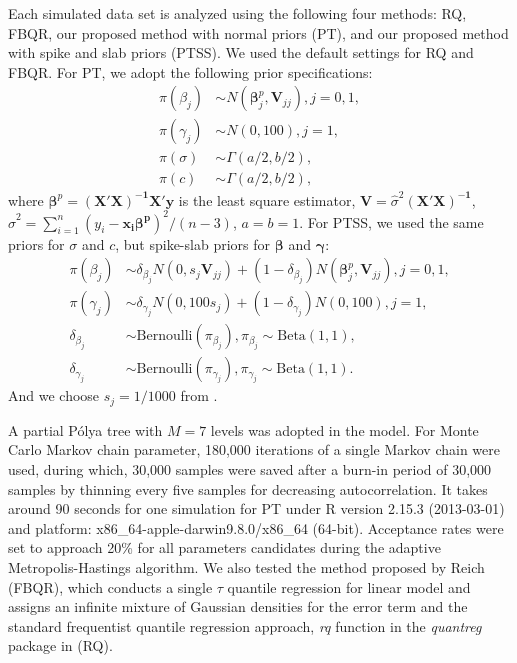 \documentclass[12pt]{article}
\newcommand{\polya}{P\'{o}lya}
\begin{document}
Each simulated data set is analyzed using the following four methods:
RQ, FBQR, our proposed method with normal priors (PT), and our
proposed method with spike and slab priors (PTSS).  We used the
default settings for RQ and FBQR.  For PT, we adopt the following
prior specifications:
\begin{align*}
  \pi(\beta_j) & \sim N(\bm \beta_j^p, \bm V_{jj}) , j = 0, 1,\\
  \pi(\gamma_j) & \sim N(0, 100), j = 1,\\
  \pi(\sigma) & \sim \Gamma (a/2, b/2), \\
  \pi(c) & \sim \Gamma(a/2, b/2),
\end{align*}
where $\bm \beta^p = \bm{(X'X)^{-1}X'y}$ is the least square
estimator, $\bm V = \hat{\sigma}^2\bm{(X'X)^{-1}}$, $\hat{\sigma}^2 =
\sum_{i = 1}^n (y_i - \bm {x_i \beta^p})^2/ (n - 3)$, $a = b = 1$.
For PTSS, we used the same priors for $\sigma$ and $c$, but spike-slab
priors for $\bm \beta$ and $\bm \gamma$:
\begin{align*}
  \pi(\beta_j) & \sim \delta_{\beta_j}N(0, s_j\bm V_{jj}) +  (1 - \delta_{\beta_j})N(\bm \beta_j^p, \bm V_{jj}) , j = 0, 1, \\
  \pi(\gamma_j) & \sim \delta_{\gamma_j}N(0, 100s_j) + (1 - \delta_{\gamma_j}) N(0, 100), j = 1, \\
  \delta_{\beta_j} & \sim \mbox{Bernoulli}(\pi_{\beta_j}) , \pi_{\beta_j} \sim \mbox{Beta}(1, 1),\\
  \delta_{\gamma_j} & \sim \mbox{Bernoulli}(\pi_{\gamma_j}),
  \pi_{\gamma_j} \sim \mbox{Beta}(1, 1).
\end{align*}
And we choose $s_j = 1/1000$ from \cite{george1993}.

A partial \polya{} tree with $M=7$ levels was adopted in the
model. For Monte Carlo Markov chain parameter, 180,000 iterations of a
single Markov chain were used, during which, 30,000 samples were saved
after a burn-in period of 30,000 samples by thinning every five samples for
decreasing autocorrelation.  It takes around 90 seconds
for one simulation for PT under R version 2.15.3 (2013-03-01) and
platform: x86\_64-apple-darwin9.8.0/x86\_64 (64-bit). Acceptance rates
were set to approach 20\% for all parameters
candidates during the adaptive Metropolis-Hastings algorithm.  We also
tested the method proposed by Reich (FBQR), which conducts a single
$\tau$ quantile regression for linear model and assigns an infinite
mixture of Gaussian densities for the error term and the standard
frequentist quantile regression approach, \textit{rq} function in the
\textit{quantreg} package \citep{quantreg} in \cite{R} (RQ).
\end{document}
